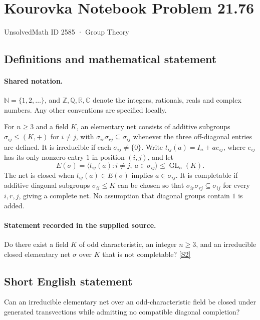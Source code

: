 \documentclass[11pt]{article}
\newcommand{\sref}[2]{\hyperlink{source:#1:#2}{[S#2]}}
\begin{document}
\setcounter{section}{2584}
\section{Kourovka Notebook Problem 21.76}\label{2585}
{\small\sffamily UnsolvedMath ID 2585 · Group Theory}
\subsection{Definitions and mathematical statement}

\paragraph{Shared notation.}$\mathbb N=\{1,2,\ldots\}$, and $\mathbb Z,\mathbb Q,\mathbb R,\mathbb C$ denote the integers, rationals, reals and complex numbers. Any other conventions are specified locally.


For $n\geq3$ and a field $K$, an elementary net consists of additive subgroups $\sigma_{ij}\leq(K,+)$ for $i\ne j$, with $\sigma_{ir}\sigma_{rj}\subseteq\sigma_{ij}$ whenever the three off-diagonal entries are defined. It is irreducible if each $\sigma_{ij}\ne\{0\}$. Write $t_{ij}(a)=I_n+a e_{ij}$, where $e_{ij}$ has its only nonzero entry $1$ in position $(i,j)$, and let
\[
 E(\sigma)=\langle t_{ij}(a):i\ne j,\ a\in\sigma_{ij}\rangle\leq\operatorname{GL}_n(K).
\]
The net is closed when $t_{ij}(a)\in E(\sigma)$ implies $a\in\sigma_{ij}$. It is completable if additive diagonal subgroups $\sigma_{ii}\leq K$ can be chosen so that $\sigma_{ir}\sigma_{rj}\subseteq\sigma_{ij}$ for every $i,r,j$, giving a complete net. No assumption that diagonal groups contain $1$ is added.
\paragraph{Statement recorded in the supplied source.}
Do there exist a field $K$ of odd characteristic, an integer $n\geq3$, and an irreducible closed elementary net $\sigma$ over $K$ that is not completable? \sref{2585}{2}
\subsection{Short English statement}
Can an irreducible elementary net over an odd-characteristic field be closed under generated transvections while admitting no compatible diagonal completion?
\end{document}
